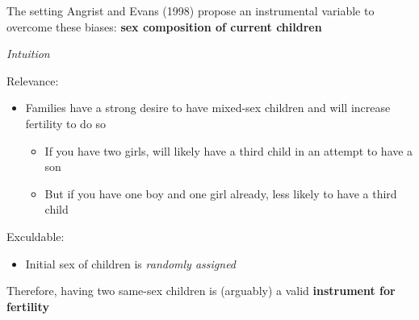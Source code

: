 \documentclass[
  ignorenonframetext,
]{beamer}
\providecommand{\tightlist}{%
  \setlength{\itemsep}{0pt}\setlength{\parskip}{0pt}}
\begin{document}
\begin{frame}{The setting}
\label{the-setting-2}
Angrist and Evans (1998) propose an instrumental variable to overcome
these biases: \textbf{sex composition of current children}

\emph{Intuition}

Relevance:

\begin{itemize}
\tightlist
\item
  Families have a strong desire to have mixed-sex children and will
  increase fertility to do so

  \begin{itemize}
  \tightlist
  \item
    If you have two girls, will likely have a third child in an attempt
    to have a son
  \item
    But if you have one boy and one girl already, less likely to have a
    third child
  \end{itemize}
\end{itemize}

Exculdable:

\begin{itemize}
\tightlist
\item
  Initial sex of children is \emph{randomly assigned}
\end{itemize}

Therefore, having two same-sex children is (arguably) a valid
\textbf{instrument for fertility}
\end{frame}
\end{document}
